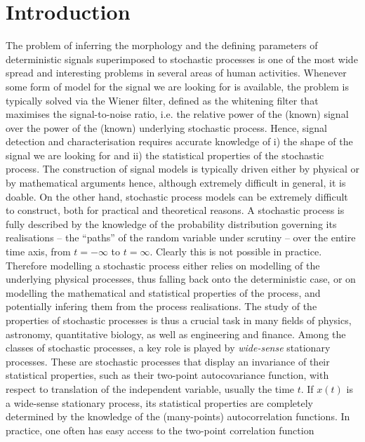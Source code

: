 \documentclass{aa}
\begin{document}
	
	\maketitle


\section{Introduction}

The problem of inferring the morphology and the defining parameters of deterministic signals superimposed to stochastic processes is one of the most wide spread and interesting problems in several areas of human activities. Whenever some form of model for the signal we are looking for is available, the problem is typically solved via the Wiener filter, defined as the whitening filter that maximises the signal-to-noise ratio, i.e. the relative power of the (known) signal over the power of the (known) underlying stochastic process. Hence, signal detection and characterisation requires accurate knowledge of i) the shape of the signal we are looking for and ii) the statistical properties of the stochastic process. The construction of signal models is typically driven either by physical or by mathematical arguments hence, although extremely difficult in general, it is doable. On the other hand, stochastic process models can be extremely difficult to construct, both for practical and theoretical reasons. A stochastic process is fully described by the knowledge of the probability distribution governing its realisations -- the ``paths'' of the random variable under scrutiny -- over the entire time axis, from $t=-\infty$ to $t=\infty$. Clearly this is not possible in practice. Therefore modelling a stochastic process either relies on modelling of the underlying physical processes, thus falling back onto the deterministic case, or on modelling the mathematical and statistical properties of the process, and potentially infering them from the process realisations. The study of the properties of stochastic processes is thus a crucial task in many fields of physics, astronomy, quantitative biology, as well as engineering and finance. Among the classes of stochastic processes, a key role is played by \textit{wide-sense} stationary processes. These are stochastic processes that display an invariance of their statistical properties, such as their two-point autocovariance function, with respect to translation of the independent variable, usually the time $t$. If $x(t)$ is a wide-sense stationary process, its statistical properties are completely determined by the knowledge of the (many-points) autocorrelation functions. In practice, one often has easy access to the two-point correlation function 
\end{document}
